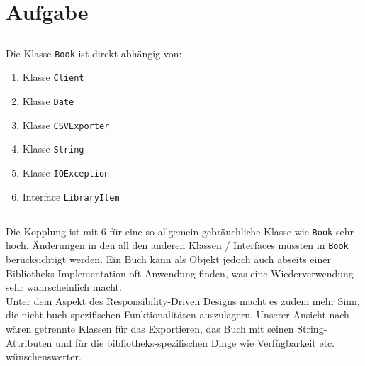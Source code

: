 \chapter{Aufgabe}
\section{}
Die Klasse \texttt{Book} ist direkt abhängig von:
\begin{enumerate}
	\item Klasse \texttt{Client}
	\item Klasse \texttt{Date}
	\item Klasse \texttt{CSVExporter}
	\item Klasse \texttt{String}
	\item Klasse \texttt{IOException}
	\item Interface \texttt{LibraryItem}

\end{enumerate}

\section{}
Die Kopplung ist mit 6 für eine so allgemein gebräuchliche Klasse wie \texttt{Book} sehr hoch.
Änderungen in den all den anderen Klassen / Interfaces müssten in \texttt{Book} berücksichtigt werden. 
Ein Buch kann als Objekt jedoch auch abseits einer Bibliotheks-Implementation oft Anwendung finden, was eine Wiederverwendung sehr wahrscheinlich macht.
\\ 
Unter dem Aspekt des Responsibility-Driven Designs macht es zudem mehr Sinn, die nicht buch-spezifischen Funktionalitäten auszulagern.
Unserer Ansicht nach wären getrennte Klassen für das Exportieren, das Buch mit seinen String-Attributen und für die bibliotheks-spezifischen Dinge wie Verfügbarkeit etc. wünschenswerter.  
